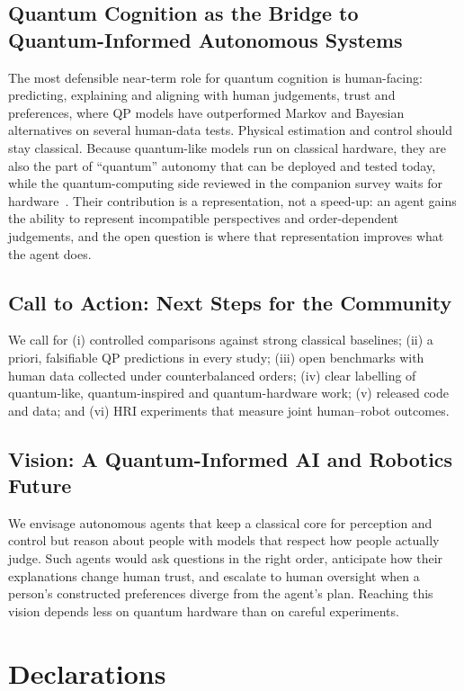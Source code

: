 \documentclass[pdflatex,sn-basic]{sn-jnl}
\begin{document}
\subsection{Quantum Cognition as the Bridge to Quantum-Informed Autonomous Systems}
The most defensible near-term role for quantum cognition is human-facing: predicting, explaining and aligning with human judgements, trust and preferences, where QP models have outperformed Markov and Bayesian alternatives on several human-data tests. Physical estimation and control should stay classical. Because quantum-like models run on classical hardware, they are also the part of ``quantum'' autonomy that can be deployed and tested today, while the quantum-computing side reviewed in the companion survey waits for hardware~\citep{Guru2026}. Their contribution is a representation, not a speed-up: an agent gains the ability to represent incompatible perspectives and order-dependent judgements, and the open question is where that representation improves what the agent does.

\subsection{Call to Action: Next Steps for the Community}
We call for (i) controlled comparisons against strong classical baselines; (ii) a priori, falsifiable QP predictions in every study; (iii) open benchmarks with human data collected under counterbalanced orders; (iv) clear labelling of quantum-like, quantum-inspired and quantum-hardware work; (v) released code and data; and (vi) HRI experiments that measure joint human--robot outcomes.

\subsection{Vision: A Quantum-Informed AI and Robotics Future}
We envisage autonomous agents that keep a classical core for perception and control but reason about people with models that respect how people actually judge. Such agents would ask questions in the right order, anticipate how their explanations change human trust, and escalate to human oversight when a person's constructed preferences diverge from the agent's plan. Reaching this vision depends less on quantum hardware than on careful experiments.


\section*{Declarations}
\end{document}
